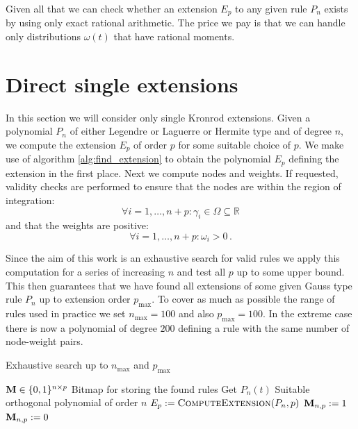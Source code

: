 \documentclass[a4paper,10pt]{article}
\begin{document}
Given all that we can check whether an extension $E_p$ to any given rule $P_n$
exists by using only exact rational arithmetic. The price we pay is that we can
handle only distributions $\omega(t)$ that have rational moments.





\section{Direct single extensions}

In this section we will consider only single Kronrod extensions. Given a polynomial
$P_n$ of either Legendre or Laguerre or Hermite type and of degree $n$, we compute
the extension $E_p$ of order $p$ for some suitable choice of $p$. We make use of algorithm
\ref{alg:find_extension} to obtain the polynomial $E_p$ defining the extension in
the first place. Next we compute nodes and weights. If requested, validity checks
are performed to ensure that the nodes are within the region of integration:
\begin{equation}
  \forall i = 1, \ldots, n+p: \gamma_i \in \Omega \subseteq \mathbb{R}
\end{equation}
and that the weights are positive:
\begin{equation}
  \forall i = 1, \ldots, n+p: \omega_i > 0 \,.
\end{equation}

Since the aim of this work is an exhaustive search for valid rules we apply
this computation for a series of increasing $n$ and test all $p$ up to some
upper bound. This then guarantees that we have found all extensions of
some given Gauss type rule $P_n$ up to extension order $p_{\textrm{max}}$.
To cover as much as possible the range of rules used in practice we set
$n_{\mathrm{max}} = 100$ and also $p_{\textrm{max}} = 100$. In the extreme case
there is now a polynomial of degree $200$ defining a rule with the same number
of node-weight pairs.

\begin{algorithm}
  \caption{Exhaustive search up to $n_{\textrm{max}}$ and $p_{\textrm{max}}$}
  \label{alg:compute_weights}
  \begin{algorithmic}
      \State $\mathbf{M} \in \{0,1\}^{n \times p}$
      \Comment Bitmap for storing the found rules
        \State Get $P_n(t)$
        \Comment Suitable orthogonal polynomial of order $n$
          \State $E_p := \textsc{ComputeExtension}(P_n, p)$
            \State $\mathbf{M}_{n,p} := 1$
          \Else
            \State $\mathbf{M}_{n,p} := 0$
          \EndIf
        \EndFor
      \EndFor
    \EndProcedure
  \end{algorithmic}
\end{algorithm}
\end{document}
